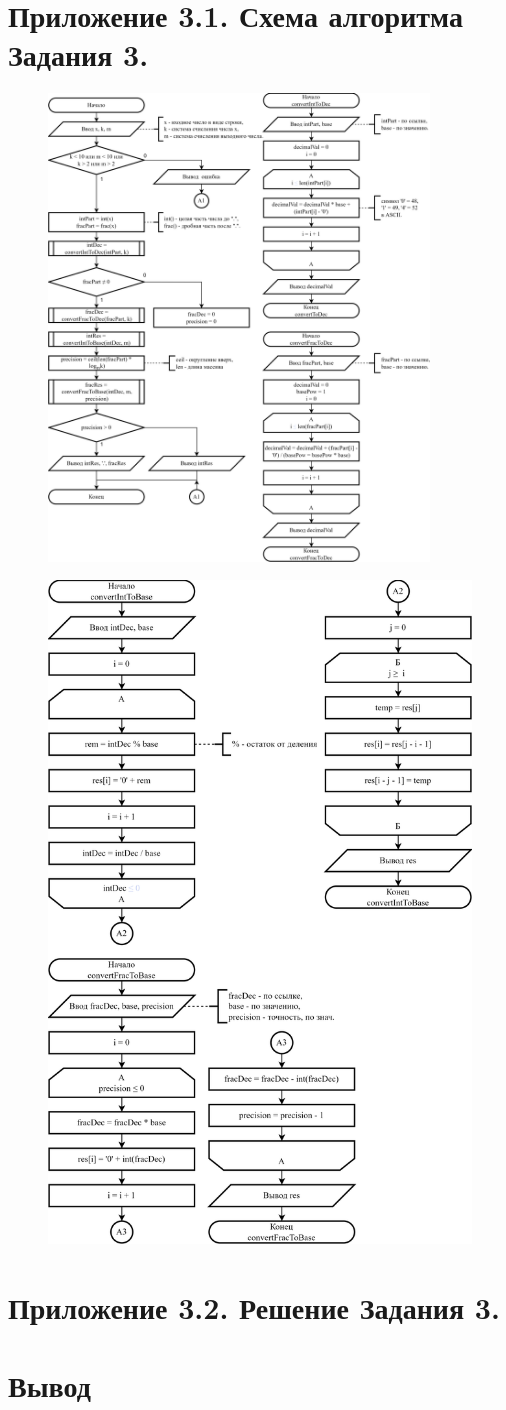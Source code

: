 \documentclass[oneside,a4paper,14pt]{extarticle} %
\begin{document}
\section*{Приложение 3.1. Схема алгоритма Задания 3.}
\begin{figure}[h!]
	\centering
	\includegraphics[width=0.9\textwidth]{pics/3-flowchart-p1.png}
\end{figure}
\newpage
\begin{figure}[h!]
	\centering
	\includegraphics[height=\textwidth]{pics/3-flowchart-p2.png}
\end{figure}
\newpage
\section*{Приложение 3.2. Решение Задания 3.}
\newpage
\section*{Вывод}
\end{document}
